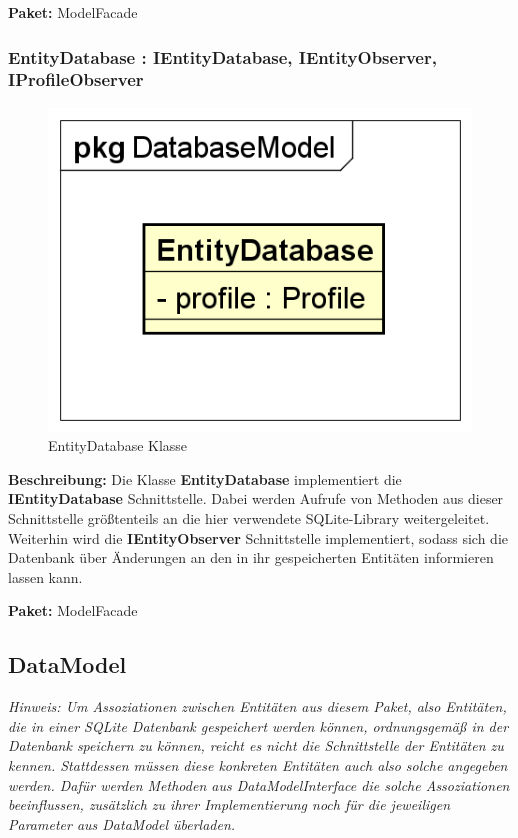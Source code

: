 \documentclass[a4paper]{scrreprt}
\begin{document}
\textbf{Paket:} ModelFacade

\subsubsection{EntityDatabase : IEntityDatabase, IEntityObserver, IProfileObserver}
\begin{figure}[H]
\centering
\includegraphics[width=0.75\textheight]{graphics/Klassendiagramme/Model/EntityDatabase.png}
\caption{EntityDatabase Klasse}
\end{figure}
\textbf{Beschreibung:} Die Klasse \textbf{EntityDatabase} implementiert die \textbf{IEntityDatabase} Schnittstelle. Dabei werden Aufrufe von Methoden aus dieser Schnittstelle größtenteils an die hier verwendete SQLite-Library weitergeleitet.\\
Weiterhin wird die \textbf{IEntityObserver} Schnittstelle implementiert, sodass sich die Datenbank über Änderungen an den in ihr gespeicherten Entitäten informieren lassen kann.

\textbf{Paket:} ModelFacade

\subsection{DataModel}
\textit{Hinweis: Um Assoziationen zwischen Entitäten aus diesem Paket, also Entitäten, die in einer SQLite Datenbank gespeichert werden können, ordnungsgemäß in der Datenbank speichern zu können, reicht es nicht die Schnittstelle der Entitäten zu kennen. Stattdessen müssen diese konkreten Entitäten auch also solche angegeben werden. Dafür werden Methoden aus DataModelInterface die solche Assoziationen beeinflussen, zusätzlich zu ihrer Implementierung noch für die jeweiligen Parameter aus DataModel überladen.}
\end{document}
